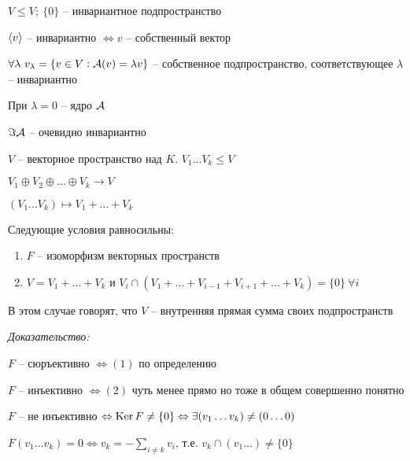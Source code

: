\documentclass[12pt]{article}
\begin{document}
\begin{Example}{}
    $V \leq V;\ \{0\}$ -- инвариантное подпространство

    $\langle v \rangle$ -- инвариантно $\Leftrightarrow v$ -- собственный вектор

    $\forall \lambda\ v_\lambda = \{v \in V : \mathcal{A}(v) = \lambda v\}$ -- собственное подпространство, соответствующее $\lambda$ -- инвариантно 

    При $\lambda = 0$ -- ядро $\mathcal{A}$

    $\Im \mathcal{A}$ -- очевидно инвариантно
\end{Example}

\begin{Reminder}{}
    $V$ -- векторное пространство над $K$. $V_1 \ldots V_k \leq V$

    $V_1 \oplus V_2 \oplus \ldots \oplus V_k \to V$

    $(V_1 \ldots V_k) \mapsto V_1 + \ldots + V_k$
\end{Reminder}

\begin{theo}{}
    Следующие условия равносильны:

    \begin{enumerate}
        \item $F$ -- изоморфизм векторных пространств 
        \item $V = V_1 + \ldots + V_k$ и $V_i \cap (V_1 + \ldots + V_{i - 1} + V_{i + 1} + \ldots + V_k) = \{0\}\ \forall i$
    \end{enumerate}

    В этом случае говорят, что $V$ -- внутренняя прямая сумма своих подпространств
\end{theo}

\textit{Доказательство:}

$F$ -- сюръективно $\Leftrightarrow (1)$ по определению

$F$ -- инъективно $\Leftrightarrow (2)$ чуть менее прямо но тоже в общем совершенно понятно

$F$ -- не инъективно $\Leftrightarrow \operatorname{Ker} F \neq \{0\} \Leftrightarrow \exists (v_1 \ldots v_k) \neq (0 \ldots 0)$

$F(v_1 \ldots v_k) = 0 \Leftrightarrow v_k = -\sum\limits_{i \neq k} v_i$, т.е. $v_k \cap (v_1 \ldots ) \neq \{0\}$
\end{document}
